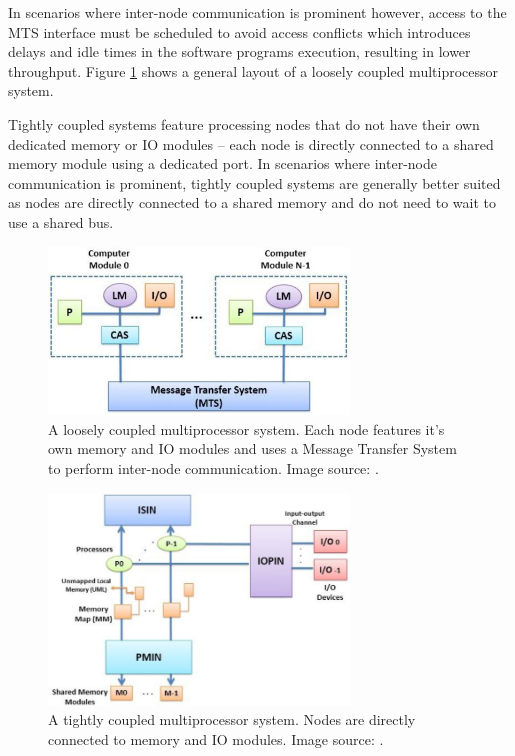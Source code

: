 \documentclass[11pt,a4paper]{report}
\begin{document}
{In scenarios where inter-node communication is prominent however, access to the MTS interface must be scheduled to avoid access conflicts which introduces delays and idle times in the software programs execution, resulting in lower throughput. Figure \ref{fig:loose} shows a general layout of a loosely coupled multiprocessor system.

Tightly coupled systems feature processing nodes that do not have their own dedicated memory or IO modules -- each node is directly connected to a shared memory module using a dedicated  port. In scenarios where inter-node communication is prominent, tightly coupled systems are generally better suited as nodes are directly connected to a shared memory and do not need to wait to use a shared bus.

\begin{minipage}{0.45\textwidth}
\begin{figure}[H]
\centering
\includegraphics[width=8cm]{../img/loose}
\caption{A loosely coupled multiprocessor system. Each node features it's own memory and IO modules and uses a Message Transfer System to perform inter-node communication. Image source: \cite{preeti_aritra_2017}.}
\label{fig:loose}
\end{figure}
\end{minipage}
\begin{minipage}{0.05\textwidth}\hfill\end{minipage}
\begin{minipage}{0.45\textwidth}
\begin{figure}[H]
\centering
\includegraphics[width=8cm]{../img/tight}
\caption{A tightly coupled multiprocessor system. Nodes are directly connected to memory and IO modules. Image source: \cite{preeti_aritra_2017}.}
\label{fig:tight}
\end{figure}
\end{minipage}
\vspace{0.3cm}

}
\end{document}
